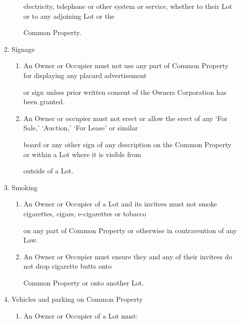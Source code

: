 \documentclass{article}
\begin{document}
\begin{enumerate}[label=\arabic*.]
\begin{enumerate}[label=\arabic{enumi}.\arabic*.]
\begin{enumerate}[label=(\arabic*)]
{\fontsize{10.02}{1}electricity, telephone or other system or service, whether to their Lot or to any adjoining Lot or the }

{\fontsize{10.02}{1}Common Property. }

\end{enumerate}
\item {\fontsize{9.99}{1} Signage }

\begin{enumerate}[label=(\arabic*)]
\item {\fontsize{9.962}{1} An Owner or Occupier must not use any part of Common Property for displaying any placard advertisement }

{\fontsize{10.02}{1}or sign unless prior written consent of the Owners Corporation has been granted. }

\item {\fontsize{9.962}{1} An Owner or occupier must not erect or allow the erect of any ‘For Sale,’ ‘Auction,’ ‘For Lease’ or similar }

{\fontsize{10.02}{1}board or any other sign of any description on the Common Property or within a Lot where it is visible from }

{\fontsize{10.02}{1}outside of a Lot. }

\end{enumerate}
\item {\fontsize{9.99}{1} Smoking }

\begin{enumerate}[label=(\arabic*)]
\item {\fontsize{9.962}{1} An Owner or Occupier of a Lot and its invitees must not smoke cigarettes, cigars, e-cigarettes or tobacco }

{\fontsize{10.02}{1}on any part of Common Property or otherwise in contravention of any Law. }

\item {\fontsize{9.962}{1} An Owner or Occupier must ensure they and any of their invitees do not drop cigarette butts onto }

{\fontsize{10.02}{1}Common Property or onto another Lot. }

\end{enumerate}
\item {\fontsize{9.99}{1} Vehicles and parking on Common Property }

\begin{enumerate}[label=(\arabic*)]
\item {\fontsize{9.962}{1} An Owner or Occupier of a Lot must: }


\end{enumerate}
\end{enumerate}
\end{enumerate}
\end{document}
